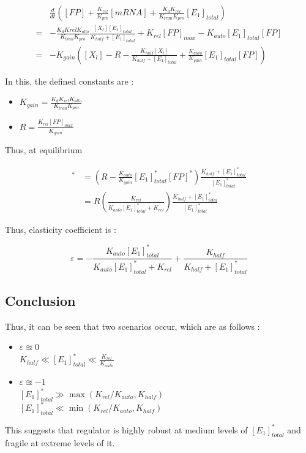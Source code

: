 \begin{align*}
    &\frac{d}{dt} ([FP] + \frac{K_{rel}}{K_{pro}}[mRNA] + \frac{K_dK_{rel}}{K_{tran}K_{pro}}[E_1]_{total})\\
    =&-\frac{K_dK{rel}K_{allo}}{K_{tran}K_{pro}} \frac{[X_l][E_1]_{total}}{K_{half}+[E_1]_{total}} + K_{rel}[FP]_{max} - K_{auto}[E_1]_{total}[FP]\\
    =&-K_{gain}([X_l] - R - \frac{K_{half}[X_l]}{K_{half} + [E_1]_{total}} + \frac{K_{auto}}{K_{gain}}[E_1]_{total}[FP])
\end{align*}

\noindent In this, the defined constants are :
\begin{itemize}
    \item $K_{gain} = \frac{K_dK_{rel}K_{allo}}{K_{tran}K_{pro}}$
    \item $R = \frac{K_{rel}[FP]_{max}}{K_{gain}}$
\end{itemize}

\noindent Thus, at equilibrium

\begin{align*}
    [X_l]^* &= (R - \frac{K_{auto}}{K_{gain}}[E_1]^*_{total}[FP]^*)\frac{K_{half}+[E_1]^*_{total}}{[E_1]^*_{total}}\\
    &= R(\frac{K_{rel}}{K_{auto}[E_1]^*_{total} + K_{rel}})\frac{K_{half}+[E_1]^*_{total}}{[E_1]^*_{total}}
\end{align*}

\noindent Thus, elasticity coefficient is :

\begin{equation*}
    \varepsilon = -\frac{K_{auto}[E_1]^*_{total}}{K_{auto}[E_1]^*_{total} + K_{rel}} + \frac{K_{half}}{K_{half} + [E_1]^*_{total}}
\end{equation*}

\subsection*{Conclusion}
Thus, it can be seen that two scenarios occur, which are as 
follows :

\begin{itemize}
    \item $\varepsilon \approxeq 0$\\ \indent $K_{half} \ll [E_1]^*_{total} \ll \frac{K_{rel}}{K_{auto}}$
    \item $\varepsilon \approxeq -1$\\ \indent $[E_1]^*_{total} \gg \max(K_{rel}/K_{auto},K_{half})$ \\ \indent $[E_1]^*_{total} \ll \min(K_{rel}/K_{auto},K_{half})$
\end{itemize}

\noindent This suggests that regulator is highly robust at 
medium levels of $[E_1]^*_{total}$ and fragile at extreme levels 
of it.